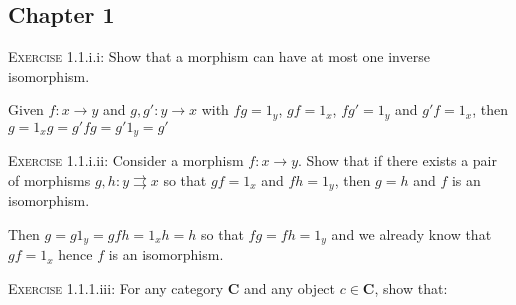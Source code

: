 \documentclass{article}
\begin{document}
\begin{center}
\section*{Chapter 1}
\end{center}

\noindent
\textsc{Exercise} 1.1.i.i: Show that a morphism can have at most one inverse isomorphism.

Given \(f:x→y\) and \(g,g':y→x\) with \(fg=1_y\), \(gf= 1_x\), \(fg' = 1_y\) and \(g'f=1_x\), then \(g=1_xg=g'fg=g'1_y=g'\)
\vspace{10pt}

\noindent
\textsc{Exercise} 1.1.i.ii: Consider a morphism \(f: x → y\). Show  that if there exists a pair of morphisms \(g,h:y\rightrightarrows x\) so that \(gf=1_x\) and \(fh=1_y\), then \(g = h\) and \(f\) is an isomorphism.

Then \(g = g1_y = gfh = 1_xh = h\) so that \(fg = fh = 1_y\) and we already know that \(gf = 1_x\) hence \(f\) is an isomorphism.
\vspace{10pt}

\noindent
\textsc{Exercise} 1.1.1.iii: For any category \(\mathbf{C}\) and any object \(c∈\mathbf{C}\), show that:
\end{document}
